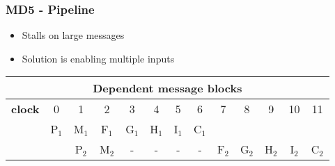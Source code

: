\begin{frame}
  \frametitle{MD5 - Pipeline}
  \begin{minipage}[t]{\textwidth}
    \begin{itemize}
    \item Stalls on large messages
    \item Solution is enabling multiple inputs
    \end{itemize}
  \end{minipage}
  \begin{minipage}[b]{\textwidth}
    \qquad
    \fontsize{8pt}{2}
    \selectfont
    \centering
    \begin{table}[H]
      \captionsetup{width=.8\linewidth}
      \centering
      \newline
      \vspace*{0.5cm}
      \newline
      \centering
      \begin{tabular}{c c c c c c c c c c c c c}
        \hline
        \multicolumn{13}{c}{Dependent message blocks}\\
        \hline
        \textbf{clock} & 0   &  1  &  2  &  3  &  4   & 5 &  6 &     7 &    8  & 9   &    10  &    11\\
        \hline
                       & P$_1$ & M$_1$ & F$_1$ & G$_1$ & H$_1$  & I$_1$ & C$_1$ &     &        &         &       &     \\
                       &       & P$_2$ & M$_2$ &   -   &   -    &   -    &   -   & F$_2$ & G$_2$ & H$_2$  & I$_2$ & C$_2$ \\
      \end{tabular}
    \end{table}
  \end{minipage}
\end{frame}
